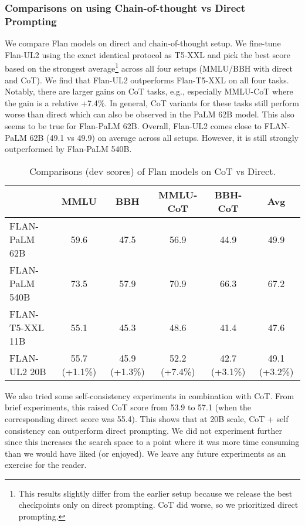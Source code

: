 \documentclass[10pt]{article}
\begin{document}
\subsubsection{Comparisons on using Chain-of-thought vs Direct Prompting}
We compare Flan models on direct and chain-of-thought setup. We fine-tune Flan-UL2 using the exact identical protocol as T5-XXL and pick the best score based on the strongest average\footnote{This results slightly differ from the earlier setup because we release the best checkpoints only on direct prompting. CoT did worse, so we prioritized direct prompting.} across all four setups (MMLU/BBH with direct and CoT). We find that Flan-UL2 outperforms Flan-T5-XXL on all four tasks. Notably, there are larger gains on CoT tasks, e.g., especially MMLU-CoT where the gain is a relative +7.4\%. In general, CoT variants for these tasks still perform worse than direct which can also be observed in the PaLM 62B model. This also seems to be true for Flan-PaLM 62B. Overall, Flan-UL2 comes close to FLAN-PaLM 62B (49.1 vs 49.9) on average across all setups. However, it is still strongly outperformed by Flan-PaLM 540B. 
\begin{table}[H]
    \centering
    \begin{tabular}{l|ccccc}
    \toprule
         & MMLU & BBH & MMLU-CoT & BBH-CoT & Avg \\
        \midrule
           FLAN-PaLM 62B & 59.6 & 47.5 & 56.9&44.9 & 49.9  \\ 
           FLAN-PaLM 540B & 73.5 & 57.9 & 70.9 & 66.3 & 67.2\\
           \midrule
        FLAN-T5-XXL 11B & 55.1 & 45.3 & 48.6 & 41.4 & 47.6 \\
        FLAN-UL2 20B & 55.7 (+1.1\%) & 45.9 (+1.3\%) &  52.2 (+7.4\%) & 42.7 (+3.1\%) & 49.1 (+3.2\%)\\ 
        \bottomrule
    \end{tabular}
    \caption{Comparisons (dev scores) of Flan models on CoT vs Direct.}
    \label{tab:my_label}
\end{table}
We also tried some self-consistency \citep{self_consistency} experiments in combination with CoT. From brief experiments, this raised CoT score from 53.9 to 57.1 (when the corresponding direct score was 55.4). This shows that at 20B scale, CoT + self consistency can outperform direct prompting. We did not experiment further since this increases the search space to a point where it was more time consuming than we would have liked (or enjoyed). We leave any future experiments as an exercise for the reader. 
\end{document}
